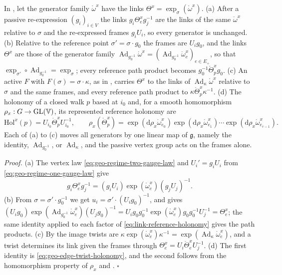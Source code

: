 In , let the generator family $\mathring\omega^x$ have the links
$\Theta^x=\exp_\sigma(\mathring\omega^x)$. (a) After a passive re-expression $(g_i)_{i\in V}$ the links
$g_i\Theta^x_eg_j^{-1}$ are the links of the same $\mathring\omega^x$ relative to $\sigma$ and the
re-expressed frames $g_iU_i$, so every generator is unchanged. (b) Relative to the reference point
$\sigma'=\sigma\cdot g_0$ the frames are $U_ig_0$, and the links $\Theta^x$ are those of the generator
family $\operatorname{Ad}_{g_0^{-1}}\mathring\omega^x=(\operatorname{Ad}_{g_0^{-1}}\mathring\omega^x_e)_{e\in E_+}$,
so that $\exp_{\sigma'}\circ\operatorname{Ad}_{g_0^{-1}}=\exp_\sigma$; every reference path product
becomes $g_0^{-1}\mathring\Theta^x_pg_0$. (c) An active $F$ with $F(\sigma)=\sigma\cdot\kappa$, as in
, carries $\Theta^x$ to the links of
$\operatorname{Ad}_\kappa\mathring\omega^x$ relative to $\sigma$ and the same frames, and every
reference path product to $\kappa\mathring\Theta^x_p\kappa^{-1}$. (d) The holonomy of a closed walk
$p$ based at $i_0$ and, for a smooth homomorphism $\rho_x:G\to\mathrm{GL}(\mathbb V)$, its represented
reference holonomy are
\begin{equation}
\mathrm{Hol}^x(p)=U_{i_0}\mathring\Theta^x_pU_{i_0}^{-1},
\qquad
\rho_x(\mathring\Theta^x_p)=\exp(\mathrm d\rho_x\mathring\omega^x_{e_0})\exp(\mathrm d\rho_x\mathring\omega^x_{e_1})\cdots\exp(\mathrm d\rho_x\mathring\omega^x_{e_{r-1}}).
\label{eq:link-holonomy-chart}
\end{equation}
Each of (a) to (c) moves all generators by one linear map of $\mathfrak g$, namely the identity,
$\operatorname{Ad}_{g_0^{-1}}$, or $\operatorname{Ad}_\kappa$, and the passive vertex group acts on the
frames alone. 

\noindent\emph{Proof.}
(a) The vertex law \cref{eq:geo-regime-two-gauge-law} and $U_i'=g_iU_i$ from
\cref{eq:geo-regime-one-gauge-law} give
\begin{equation*}
g_i\Theta^x_eg_j^{-1}=(g_iU_i)\exp(\mathring\omega^x_e)(g_jU_j)^{-1}.
\end{equation*}
(b) From
$\sigma=\sigma'\cdot g_0^{-1}$ we get $u_i=\sigma'\cdot(U_ig_0)^{-1}$, and
 gives
$(U_ig_0)\exp(\operatorname{Ad}_{g_0^{-1}}\mathring\omega^x_e)(U_jg_0)^{-1}=U_ig_0g_0^{-1}\exp(\mathring\omega^x_e)g_0g_0^{-1}U_j^{-1}=\Theta^x_e$;
the same identity applied to each factor of \cref{eq:link-reference-holonomy} gives the path products.
(c) By  the image twists are
$\kappa\exp(\mathring\omega^x_e)\kappa^{-1}=\exp(\operatorname{Ad}_\kappa\mathring\omega^x_e)$, and a twist
determines its link given the frames through $\Theta^x_e=U_i\mathring\Theta^x_eU_j^{-1}$. (d) The first
identity is \cref{eq:geo-edge-twist-holonomy}, and the second follows from the homomorphism property of
$\rho_x$ and . \hfill$\square$

